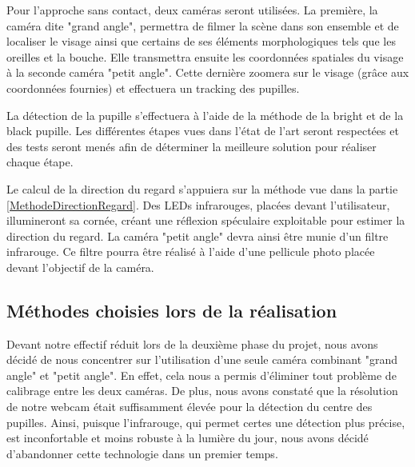 Pour l'approche sans contact, deux caméras seront utilisées. La première, la caméra dite "grand angle", permettra de filmer la scène dans son ensemble et de localiser le visage ainsi que certains de ses éléments morphologiques tels que les oreilles et la bouche. Elle transmettra ensuite les coordonnées spatiales du visage à la seconde caméra "petit angle". Cette dernière zoomera sur le visage (grâce aux coordonnées fournies) et effectuera un tracking des pupilles.  

La détection de la pupille s’effectuera à l’aide de la méthode de la bright et de la black pupille. Les différentes étapes vues dans l’état de l’art seront respectées et des tests seront menés afin de déterminer la meilleure solution pour réaliser chaque étape.
 
Le calcul de la direction du regard s’appuiera sur la méthode vue dans la partie \ref{MethodeDirectionRegard}. Des LEDs infrarouges, placées devant l’utilisateur, illumineront sa cornée, créant une réflexion spéculaire exploitable pour estimer la direction du regard. La caméra "petit angle" devra ainsi être munie d’un filtre infrarouge. Ce filtre pourra être réalisé à l’aide d’une pellicule photo placée devant l’objectif de la caméra. 

\subsection{Méthodes choisies lors de la réalisation} 
\label{MethodesChoisies}
Devant notre effectif réduit lors de la deuxième phase du projet, nous avons décidé de nous concentrer sur l'utilisation d'une seule caméra combinant "grand angle" et "petit angle". En effet, cela nous a permis d'éliminer tout problème de calibrage entre les deux caméras. De plus, nous avons constaté que la résolution de notre webcam était suffisamment élevée pour la détection du centre des pupilles. Ainsi, puisque l'infrarouge, qui permet certes une détection plus précise, est inconfortable et moins robuste à la lumière du jour, nous avons décidé d'abandonner cette technologie dans un premier temps.
